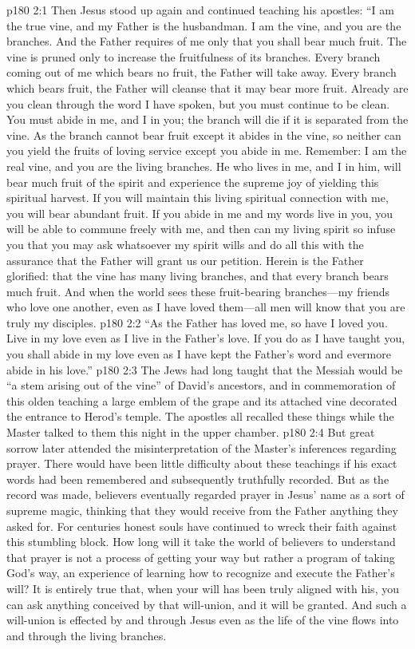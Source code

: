 \vs p180 2:1 Then Jesus stood up again and continued teaching his apostles: \textcolor{ubdarkred}{“I am the true vine, and my Father is the husbandman. I am the vine, and you are the branches. And the Father requires of me only that you shall bear much fruit. The vine is pruned only to increase the fruitfulness of its branches. Every branch coming out of me which bears no fruit, the Father will take away. Every branch which bears fruit, the Father will cleanse that it may bear more fruit. Already are you clean through the word I have spoken, but you must continue to be clean. You must abide in me, and I in you; the branch will die if it is separated from the vine. As the branch cannot bear fruit except it abides in the vine, so neither can you yield the fruits of loving service except you abide in me. Remember: I am the real vine, and you are the living branches. He who lives in me, and I in him, will bear much fruit of the spirit and experience the supreme joy of yielding this spiritual harvest. If you will maintain this living spiritual connection with me, you will bear abundant fruit. If you abide in me and my words live in you, you will be able to commune freely with me, and then can my living spirit so infuse you that you may ask whatsoever my spirit wills and do all this with the assurance that the Father will grant us our petition. Herein is the Father glorified: that the vine has many living branches, and that every branch bears much fruit. And when the world sees these fruit\hyp{}bearing branches---my friends who love one another, even as I have loved them---all men will know that you are truly my disciples.}
\vs p180 2:2 \textcolor{ubdarkred}{“As the Father has loved me, so have I loved you. Live in my love even as I live in the Father’s love. If you do as I have taught you, you shall abide in my love even as I have kept the Father’s word and evermore abide in his love.”}
\vs p180 2:3 The Jews had long taught that the Messiah would be “a stem arising out of the vine” of David’s ancestors, and in commemoration of this olden teaching a large emblem of the grape and its attached vine decorated the entrance to Herod’s temple. The apostles all recalled these things while the Master talked to them this night in the upper chamber.
\vs p180 2:4 But great sorrow later attended the misinterpretation of the Master’s inferences regarding prayer. There would have been little difficulty about these teachings if his exact words had been remembered and subsequently truthfully recorded. But as the record was made, believers eventually regarded prayer in Jesus’ name as a sort of supreme magic, thinking that they would receive from the Father anything they asked for. For centuries honest souls have continued to wreck their faith against this stumbling block. How long will it take the world of believers to understand that prayer is not a process of getting your way but rather a program of taking God’s way, an experience of learning how to recognize and execute the Father’s will? It is entirely true that, when your will has been truly aligned with his, you can ask anything conceived by that will\hyp{}union, and it will be granted. And such a will\hyp{}union is effected by and through Jesus even as the life of the vine flows into and through the living branches.
